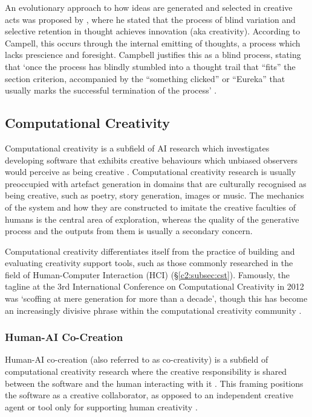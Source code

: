 An evolutionary approach to how ideas are generated and selected in creative acts was proposed by \cite{campbell1960blind}, where he stated that the process of blind variation and selective retention in thought achieves innovation (aka creativity).
According to Campell, this occurs through the internal emitting of thoughts, a process which lacks prescience and foresight.
Campbell justifies this as a blind process, stating that `once the process has blindly stumbled into a thought trail that ``fits'' the section criterion, accompanied by the ``something clicked'' or ``Eureka'' that usually marks the successful termination of the process' \citep{campbell1960blind}.

\subsection{Computational Creativity}

Computational creativity is a subfield of AI research which investigates developing software that exhibits creative behaviours which unbiased observers would perceive as being creative \citep{colton2012computational}.
Computational creativity research is usually preoccupied with artefact generation in domains that are culturally recognised as being creative, such as poetry, story generation, images or music.
The mechanics of the system and how they are constructed to imitate the creative faculties of humans is the central area of exploration, whereas the quality of the generative process and the outputs from them is usually a secondary concern.

Computational creativity differentiates itself from the practice of building and evaluating creativity support tools, such as those commonly researched in the field of Human-Computer Interaction (HCI) (\S \ref{c2:subsec:cst}).
Famously, the tagline at the 3rd International Conference on Computational Creativity in 2012 was ‘scoffing at mere generation for more than a decade’, though this has become an increasingly divisive phrase within the computational creativity community \citep{ventura2016mere}.

\subsubsection{Human-AI Co-Creation}
\label{c2:subsubsec:co-creativity}

Human-AI co-creation (also referred to as co-creativity) is a subfield of computational creativity research where the creative responsibility is shared between the software and the human interacting with it \citep{candy2002modeling}.
This framing positions the software as a creative collaborator, as opposed to an independent creative agent or tool only for supporting human creativity \citep{feldman2017co}.


